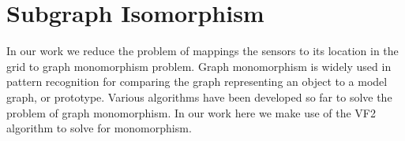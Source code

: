 \section{Subgraph Isomorphism}
In our work we reduce the problem of mappings the sensors to its location in the grid to graph monomorphism problem. Graph monomorphism is widely used in pattern recognition for comparing the graph representing an object to a model  graph, or prototype. Various algorithms have been developed so far to solve the problem of graph monomorphism. In our work here we make use of the VF2\cite{cordella2001improved} algorithm to solve for monomorphism.